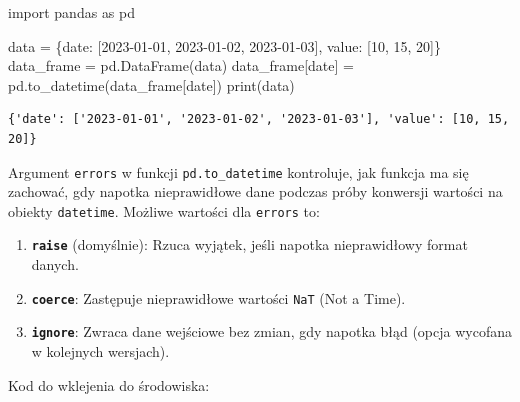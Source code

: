 \documentclass[
  polish,
  letterpaper,
  DIV=11,
  numbers=noendperiod]{scrreprt}
\newenvironment{Shaded}{\begin{snugshade}}{\end{snugshade}}
\newcommand{\BuiltInTok}[1]{\textcolor[rgb]{0.00,0.23,0.31}{#1}}
\newcommand{\DecValTok}[1]{\textcolor[rgb]{0.68,0.00,0.00}{#1}}
\newcommand{\ImportTok}[1]{\textcolor[rgb]{0.00,0.46,0.62}{#1}}
\newcommand{\NormalTok}[1]{\textcolor[rgb]{0.00,0.23,0.31}{#1}}
\newcommand{\OperatorTok}[1]{\textcolor[rgb]{0.37,0.37,0.37}{#1}}
\newcommand{\StringTok}[1]{\textcolor[rgb]{0.13,0.47,0.30}{#1}}
\providecommand{\tightlist}{%
  \setlength{\itemsep}{0pt}\setlength{\parskip}{0pt}}
\begin{document}
\begin{Shaded}
\begin{Highlighting}[]
\ImportTok{import}\NormalTok{ pandas }\ImportTok{as}\NormalTok{ pd}

\NormalTok{data }\OperatorTok{=}\NormalTok{ \{}\StringTok{\textquotesingle{}date\textquotesingle{}}\NormalTok{: [}\StringTok{\textquotesingle{}2023{-}01{-}01\textquotesingle{}}\NormalTok{, }\StringTok{\textquotesingle{}2023{-}01{-}02\textquotesingle{}}\NormalTok{, }\StringTok{\textquotesingle{}2023{-}01{-}03\textquotesingle{}}\NormalTok{], }\StringTok{\textquotesingle{}value\textquotesingle{}}\NormalTok{: [}\DecValTok{10}\NormalTok{, }\DecValTok{15}\NormalTok{, }\DecValTok{20}\NormalTok{]\}}
\NormalTok{data\_frame }\OperatorTok{=}\NormalTok{ pd.DataFrame(data)}
\NormalTok{data\_frame[}\StringTok{\textquotesingle{}date\textquotesingle{}}\NormalTok{] }\OperatorTok{=}\NormalTok{ pd.to\_datetime(data\_frame[}\StringTok{\textquotesingle{}date\textquotesingle{}}\NormalTok{])}
\BuiltInTok{print}\NormalTok{(data)}
\end{Highlighting}
\end{Shaded}

\begin{verbatim}
{'date': ['2023-01-01', '2023-01-02', '2023-01-03'], 'value': [10, 15, 20]}
\end{verbatim}

Argument \texttt{errors} w funkcji \texttt{pd.to\_datetime} kontroluje,
jak funkcja ma się zachować, gdy napotka nieprawidłowe dane podczas
próby konwersji wartości na obiekty \texttt{datetime}. Możliwe wartości
dla \texttt{errors} to:

\begin{enumerate}
\def\labelenumi{\arabic{enumi}.}
\tightlist
\item
  \textbf{\texttt{\textquotesingle{}raise\textquotesingle{}}}
  (domyślnie): Rzuca wyjątek, jeśli napotka nieprawidłowy format danych.
\item
  \textbf{\texttt{\textquotesingle{}coerce\textquotesingle{}}}:
  Zastępuje nieprawidłowe wartości \texttt{NaT} (Not a Time).
\item
  \textbf{\texttt{\textquotesingle{}ignore\textquotesingle{}}}: Zwraca
  dane wejściowe bez zmian, gdy napotka błąd (opcja wycofana w kolejnych
  wersjach).
\end{enumerate}

Kod do wklejenia do środowiska:
\end{document}
